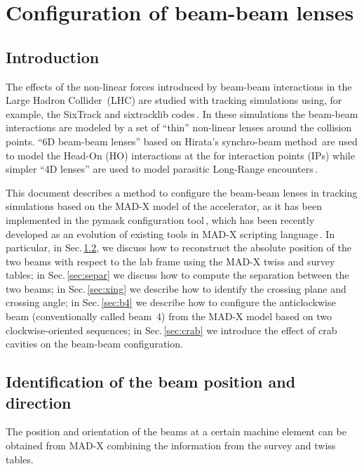 \chapter{Configuration of beam-beam lenses}

\section{Introduction}

The effects of the non-linear forces introduced by beam-beam interactions in the Large Hadron Collider~(LHC) are studied with tracking simulations using, for example, the SixTrack and sixtracklib codes\,\cite{sixtracksite, sixtracklibrepo}. In these simulations the beam-beam interactions are modeled by a set of ``thin'' non-linear lenses around the collision points.
 ``6D beam-beam lenses'' based on Hirata's synchro-beam method\,\cite{hirata, bb6dnote, bb6dslides} are used to model the Head-On (HO) interactions at the for interaction points (IPs) while simpler ``4D lenses'' are used to model parasitic Long-Range encounters\,\cite{casbeambeam}.
 
This document describes a method to configure the beam-beam lenses in tracking simulations based on the MAD-X model of the accelerator, as it has been implemented in the pymask configuration tool\,\cite{masksite}, which has been recently developed as an evolution of existing tools in MAD-X scripting language\,\cite{bbmacrorepo}. In particular, in Sec.\,\ref{sec:posdir}, we discuss how to reconstruct the absolute position of the two beams with respect to the lab frame using the MAD-X twiss and survey tables; in Sec.\,\ref{sec:separ} we discuss how to compute the separation between the two beams; in Sec.\,\ref{sec:xing} we describe how to identify the crossing plane and crossing angle; in Sec.\,\ref{sec:b4} we describe how to configure the anticlockwise beam (conventionally called beam~4)  from the MAD-X model based on two clockwise-oriented sequences; in Sec.\,\ref{sec:crab} we introduce the effect of crab cavities on the beam-beam configuration. 







\section{Identification of the beam position and direction}
\label{sec:posdir}

The position and orientation of the beams at a certain machine element can be obtained from MAD-X combining the information from the survey and twiss tables.

